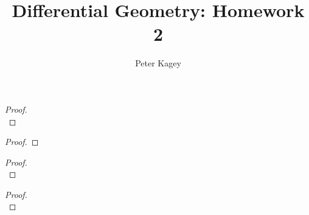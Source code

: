 \documentclass{article}
\newenvironment{problem}[2][Problem]{\begin{trivlist}
\item[\hskip \labelsep {\bfseries #1}\hskip \labelsep {\bfseries #2.}]}{\end{trivlist}}
\begin{document}
\title{Differential Geometry: Homework 2}
\author{Peter Kagey}

\maketitle

\begin{problem}{1}
\end{problem}

\begin{proof} \text{} \\
\end{proof}

\pagebreak

\begin{problem}{2}
\end{problem}

\begin{proof}
\end{proof}

\pagebreak

\begin{problem}{3}
\end{problem}

\begin{proof} \text{} \\
\end{proof}

\pagebreak

\begin{problem}{4}
\end{problem}

\begin{proof} \text{}\\
\end{proof}

\pagebreak

\begin{problem}{5}
\end{problem}
\end{document}
